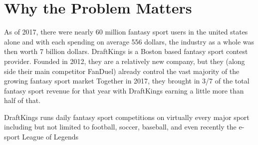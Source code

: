 \section{Why the Problem Matters}

As of 2017, there were nearly 60 million fantasy sport users in the united states alone and with each spending on average 556 dollars, the industry as a whole was then worth 7 billion dollars. DraftKings is a Boston based fantasy sport contest provider. Founded in 2012, they are a relatively new company, but they (along side their main competitor FanDuel) already control the vast majority of the growing fantasy sport market Together in 2017, they brought in 3/7 of the total fantasy sport revenue for that year with DraftKings earning a little more than half of that.

DraftKings runs daily fantasy sport competitions on virtually every major sport including but not limited to football, soccer, baseball, and even recently the e-sport League of Legends